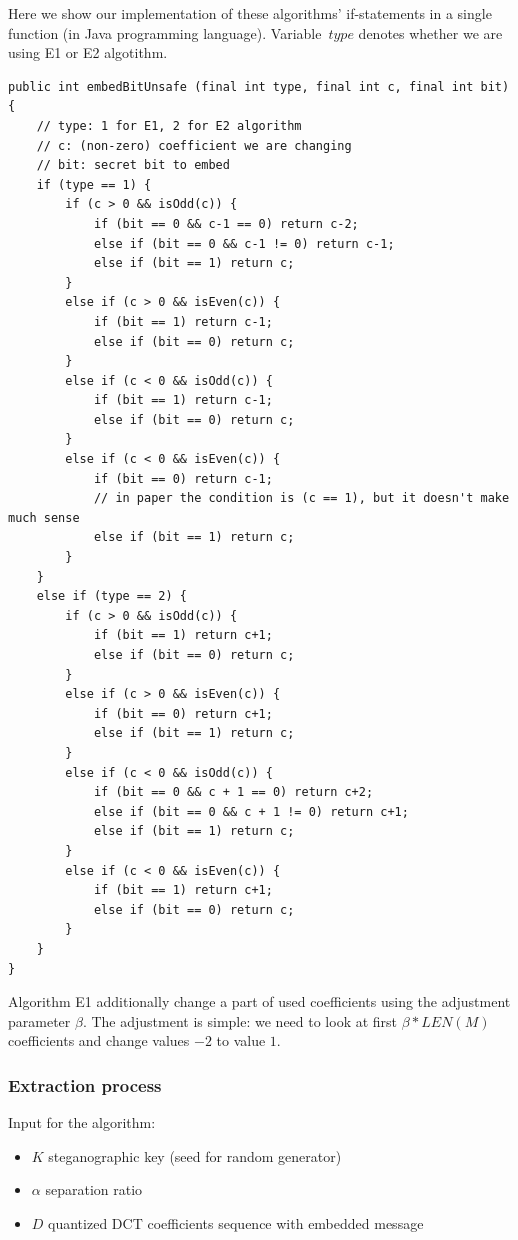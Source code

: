 Here we show our implementation of these algorithms' if-statements 
in a single function (in Java programming language). 
Variable~$type$ denotes whether we are using E1 or E2 algotithm.

\begin{lstlisting}
public int embedBitUnsafe (final int type, final int c, final int bit) {
    // type: 1 for E1, 2 for E2 algorithm
    // c: (non-zero) coefficient we are changing
    // bit: secret bit to embed
    if (type == 1) {
        if (c > 0 && isOdd(c)) {
            if (bit == 0 && c-1 == 0) return c-2;
            else if (bit == 0 && c-1 != 0) return c-1;
            else if (bit == 1) return c;
        }
        else if (c > 0 && isEven(c)) {
            if (bit == 1) return c-1;
            else if (bit == 0) return c;
        }
        else if (c < 0 && isOdd(c)) {
            if (bit == 1) return c-1;
            else if (bit == 0) return c;
        }
        else if (c < 0 && isEven(c)) {
            if (bit == 0) return c-1;
            // in paper the condition is (c == 1), but it doesn't make much sense
            else if (bit == 1) return c;
        }
    }
    else if (type == 2) {
        if (c > 0 && isOdd(c)) {
            if (bit == 1) return c+1;
            else if (bit == 0) return c;
        }
        else if (c > 0 && isEven(c)) {
            if (bit == 0) return c+1;
            else if (bit == 1) return c;
        }
        else if (c < 0 && isOdd(c)) {
            if (bit == 0 && c + 1 == 0) return c+2;
            else if (bit == 0 && c + 1 != 0) return c+1;
            else if (bit == 1) return c;
        }
        else if (c < 0 && isEven(c)) {
            if (bit == 1) return c+1;
            else if (bit == 0) return c;
        }
    }
}
\end{lstlisting}

Algorithm E1 additionally change a part of used coefficients using the adjustment
parameter $\beta$. The adjustment is simple: we need to look at first $\beta * LEN(M)$ coefficients and
change values $-2$ to value $1$.

\subsubsection{Extraction process}
Input for the algorithm:

\begin{itemize}
    \item $K$ steganographic key (seed for random generator)
    \item $\alpha$ separation ratio
    \item $D$ quantized DCT coefficients sequence with embedded message
\end{itemize}

